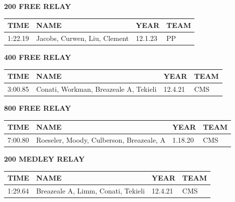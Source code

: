 \begin{table}[H]
\centering
\begin{minipage}[t]{0.6\textwidth}
\centering
\textbf{200 FREE RELAY}\\[0.1cm]
\begin{tabular}{@{}p{1.8cm}p{2.8cm}p{1.2cm}p{1.4cm}@{}}
\hline
    \textbf{TIME} & \textbf{NAME} & \textbf{YEAR} & \textbf{TEAM} \\
\hline
    1:22.19 & Jacobs, Curwen, Liu, Clement & 12.1.23 & PP \\
\hline
\end{tabular}
\end{minipage}
\end{table}

\begin{table}[H]
\centering
\begin{minipage}[t]{0.6\textwidth}
\centering
\textbf{400 FREE RELAY}\\[0.1cm]
\begin{tabular}{@{}p{1.8cm}p{2.8cm}p{1.2cm}p{1.4cm}@{}}
\hline
    \textbf{TIME} & \textbf{NAME} & \textbf{YEAR} & \textbf{TEAM} \\
\hline
    3:00.85 & Conati, Workman, Breazeale A, Tekieli & 12.4.21 & CMS \\
\hline
\end{tabular}
\end{minipage}
\end{table}

\begin{table}[H]
\centering
\begin{minipage}[t]{0.6\textwidth}
\centering
\textbf{800 FREE RELAY}\\[0.1cm]
\begin{tabular}{@{}p{1.8cm}p{2.8cm}p{1.2cm}p{1.4cm}@{}}
\hline
    \textbf{TIME} & \textbf{NAME} & \textbf{YEAR} & \textbf{TEAM} \\
\hline
    7:00.80 & Roeseler, Moody, Culberson, Breazeale, A & 1.18.20 & CMS \\
\hline
\end{tabular}
\end{minipage}
\end{table}

\begin{table}[H]
\centering
\begin{minipage}[t]{0.6\textwidth}
\centering
\textbf{200 MEDLEY RELAY}\\[0.1cm]
\begin{tabular}{@{}p{1.8cm}p{2.8cm}p{1.2cm}p{1.4cm}@{}}
\hline
    \textbf{TIME} & \textbf{NAME} & \textbf{YEAR} & \textbf{TEAM} \\
\hline
    1:29.64 & Breazeale A, Limm, Conati, Tekieli & 12.4.21 & CMS \\
\hline
\end{tabular}
\end{minipage}
\end{table}

